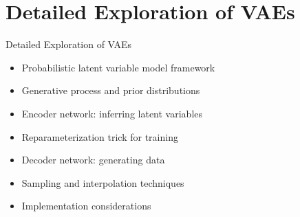 \documentclass[5pt,aspectratio=169]{beamer}
\begin{document}
\section{Detailed Exploration of VAEs}

\begin{frame}{Detailed Exploration of VAEs}
\begin{itemize}
\item Probabilistic latent variable model framework
\item Generative process and prior distributions
\item Encoder network: inferring latent variables
\item Reparameterization trick for training
\item Decoder network: generating data
\item Sampling and interpolation techniques
\item Implementation considerations
\end{itemize}

\begin{center}
\end{center}
\end{frame}
\end{document}
